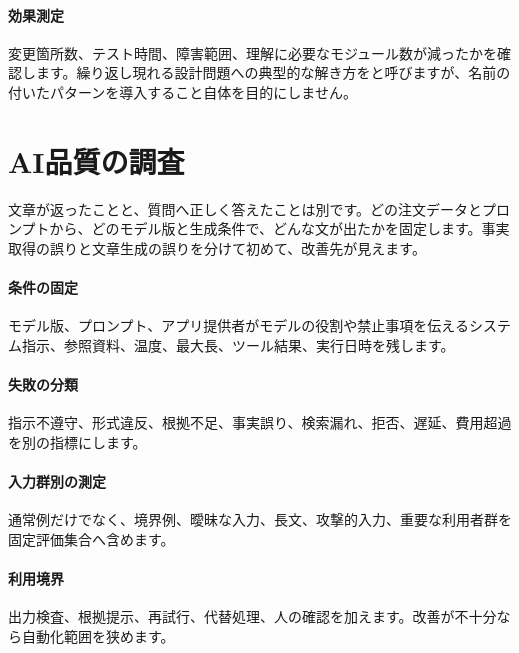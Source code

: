 \paragraph{効果測定}
        変更箇所数、テスト時間、障害範囲、理解に必要なモジュール数が減ったかを確認します。繰り返し現れる設計問題への典型的な解き方をと呼びますが、名前の付いたパターンを導入すること自体を目的にしません。

\par
\endgroup
\par
\endgroup


\section{AI品質の調査}
\label{sec:07-practice-12}

文章が返ったことと、質問へ正しく答えたことは別です。どの注文データとプロンプトから、どのモデル版と生成条件で、どんな文が出たかを固定します。事実取得の誤りと文章生成の誤りを分けて初めて、改善先が見えます。

\begingroup
\begingroup
\paragraph{条件の固定}
        モデル版、プロンプト、アプリ提供者がモデルの役割や禁止事項を伝えるシステム指示、参照資料、温度、最大長、ツール結果、実行日時を残します。

\paragraph{失敗の分類}
        指示不遵守、形式違反、根拠不足、事実誤り、検索漏れ、拒否、遅延、費用超過を別の指標にします。

\par
\endgroup
\medskip
\begingroup
\paragraph{入力群別の測定}
        通常例だけでなく、境界例、曖昧な入力、長文、攻撃的入力、重要な利用者群を固定評価集合へ含めます。

\paragraph{利用境界}
        出力検査、根拠提示、再試行、代替処理、人の確認を加えます。改善が不十分なら自動化範囲を狭めます。

\par
\endgroup
\par
\endgroup


